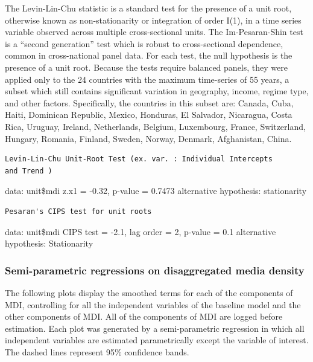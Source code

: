 \documentclass[11pt,article,oneside]{memoir}
\begin{document}
The Levin-Lin-Chu statistic is a standard test for the presence of a
unit root, otherwise known as non-stationarity or integration of order
I(1), in a time series variable observed across multiple cross-sectional
units. The Im-Pesaran-Shin test is a ``second generation'' test which is
robust to cross-sectional dependence, common in cross-national panel
data. For each test, the null hypothesis is the presence of a unit root.
Because the tests require balanced panels, they were applied only to the
24 countries with the maximum time-series of 55 years, a subset which
still contains significant variation in geography, income, regime type,
and other factors. Specifically, the countries in this subset are:
Canada, Cuba, Haiti, Dominican Republic, Mexico, Honduras, El Salvador,
Nicaragua, Costa Rica, Uruguay, Ireland, Netherlands, Belgium,
Luxembourg, France, Switzerland, Hungary, Romania, Finland, Sweden,
Norway, Denmark, Afghanistan, China.

\begin{verbatim}
Levin-Lin-Chu Unit-Root Test (ex. var. : Individual Intercepts
and Trend )
\end{verbatim}

data: unit\$mdi z.x1 = -0.32, p-value = 0.7473 alternative hypothesis:
stationarity

\begin{verbatim}
Pesaran's CIPS test for unit roots
\end{verbatim}

data: unit\$mdi CIPS test = -2.1, lag order = 2, p-value = 0.1
alternative hypothesis: Stationarity

\subsubsection{Semi-parametric regressions on disaggregated media
density}\label{semi-parametric-regressions-on-disaggregated-media-density}

The following plots display the smoothed terms for each of the
components of MDI, controlling for all the independent variables of the
baseline model and the other components of MDI. All of the components of
MDI are logged before estimation. Each plot was generated by a
semi-parametric regression in which all independent variables are
estimated parametrically except the variable of interest. The dashed
lines represent 95\% confidence bands.
\end{document}
